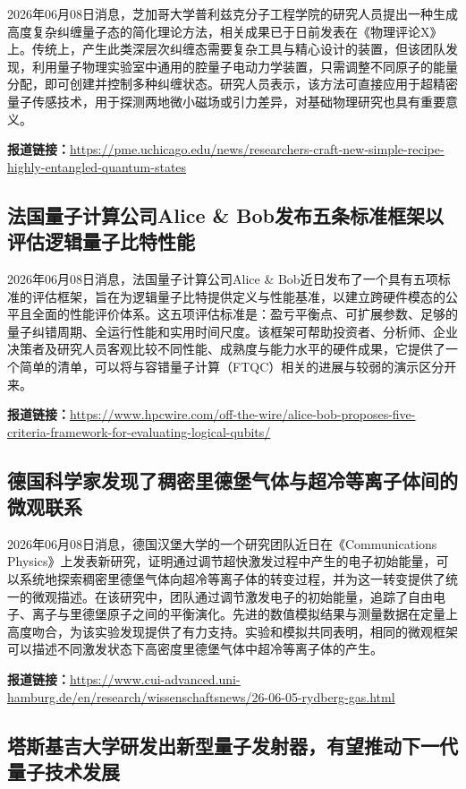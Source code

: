 \documentclass[12pt,a4paper]{ctexart}
\begin{document}
2026年06月08日消息，芝加哥大学普利兹克分子工程学院的研究人员提出一种生成高度复杂纠缠量子态的简化理论方法，相关成果已于日前发表在《物理评论X》上。传统上，产生此类深层次纠缠态需要复杂工具与精心设计的装置，但该团队发现，利用量子物理实验室中通用的腔量子电动力学装置，只需调整不同原子的能量分配，即可创建并控制多种纠缠状态。研究人员表示，该方法可直接应用于超精密量子传感技术，用于探测两地微小磁场或引力差异，对基础物理研究也具有重要意义。

\noindent\textbf{报道链接：}\url{https://pme.uchicago.edu/news/researchers-craft-new-simple-recipe-highly-entangled-quantum-states}

\subsection{ 法国量子计算公司Alice \& Bob发布五条标准框架以评估逻辑量子比特性能 }

2026年06月08日消息，法国量子计算公司Alice \& Bob近日发布了一个具有五项标准的评估框架，旨在为逻辑量子比特提供定义与性能基准，以建立跨硬件模态的公平且全面的性能评价体系。这五项评估标准是：盈亏平衡点、可扩展参数、足够的量子纠错周期、全运行性能和实用时间尺度。该框架可帮助投资者、分析师、企业决策者及研究人员客观比较不同性能、成熟度与能力水平的硬件成果，它提供了一个简单的清单，可以将与容错量子计算（FTQC）相关的进展与较弱的演示区分开来。

\noindent\textbf{报道链接：}\url{https://www.hpcwire.com/off-the-wire/alice-bob-proposes-five-criteria-framework-for-evaluating-logical-qubits/}

\subsection{ 德国科学家发现了稠密里德堡气体与超冷等离子体间的微观联系 }

2026年06月08日消息，德国汉堡大学的一个研究团队近日在《Communications Physics》上发表新研究，证明通过调节超快激发过程中产生的电子初始能量，可以系统地探索稠密里德堡气体向超冷等离子体的转变过程，并为这一转变提供了统一的微观描述。在该研究中，团队通过调节激发电子的初始能量，追踪了自由电子、离子与里德堡原子之间的平衡演化。先进的数值模拟结果与测量数据在定量上高度吻合，为该实验发现提供了有力支持。实验和模拟共同表明，相同的微观框架可以描述不同激发状态下高密度里德堡气体中超冷等离子体的产生。

\noindent\textbf{报道链接：}\url{https://www.cui-advanced.uni-hamburg.de/en/research/wissenschaftsnews/26-06-05-rydberg-gas.html}

\subsection{ 塔斯基吉大学研发出新型量子发射器，有望推动下一代量子技术发展 }
\end{document}
